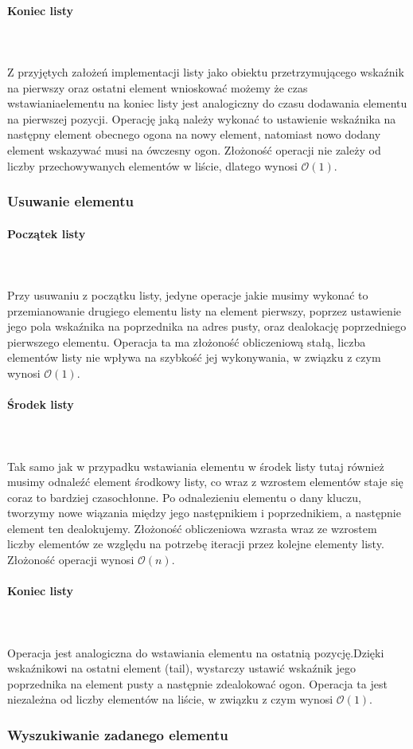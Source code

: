 \documentclass{article}
\newcommand{\myparagraph}[1]{\paragraph{#1}\mbox{}\\\\}
\begin{document}
\newpage

\myparagraph{Koniec listy} 
Z przyjętych założeń implementacji listy jako obiektu przetrzymującego wskaźnik na pierwszy oraz ostatni element wnioskować możemy że czas wstawiania\linebreak elementu na koniec listy jest analogiczny do czasu dodawania elementu na pierwszej pozycji. Operację jaką należy wykonać to ustawienie wskaźnika na następny element obecnego ogona na nowy element, natomiast nowo dodany element wskazywać musi na ówczesny ogon. Złożoność operacji nie zależy od liczby przechowywanych elementów w liście, dlatego wynosi $\mathcal{O}(1)$.

\subsubsection{Usuwanie elementu}
 
\myparagraph{Początek listy} 
Przy usuwaniu z początku listy, jedyne operacje jakie musimy wykonać to przemianowanie drugiego elementu listy na element pierwszy, poprzez ustawienie jego pola wskaźnika na poprzednika na adres pusty, oraz dealokację poprzedniego pierwszego elementu. 
Operacja ta ma złożoność obliczeniową stałą, liczba elementów listy nie wpływa na szybkość jej wykonywania, w związku z czym wynosi $\mathcal{O}(1)$.
 
\myparagraph{Środek listy}
Tak samo jak w przypadku wstawiania elementu w środek listy tutaj również musimy odnaleźć element środkowy listy, co wraz z wzrostem elementów staje się coraz to bardziej czasochłonne. Po odnalezieniu elementu o dany kluczu, tworzymy nowe wiązania między jego następnikiem i poprzednikiem, a następnie element ten dealokujemy. Złożoność obliczeniowa wzrasta wraz ze wzrostem liczby elementów ze względu na potrzebę iteracji przez kolejne elementy listy. Złożoność operacji wynosi $\mathcal{O}(n)$.
 
\myparagraph{Koniec listy} 
Operacja jest analogiczna do wstawiania elementu na ostatnią pozycję.\linebreak Dzięki wskaźnikowi na ostatni element (tail), wystarczy ustawić wskaźnik jego poprzednika na element pusty a następnie zdealokować ogon. Operacja ta jest niezależna od liczby elementów na liście, w związku z czym wynosi $\mathcal{O}(1)$.
 
\subsubsection{Wyszukiwanie zadanego elementu} 
 
\end{document}
